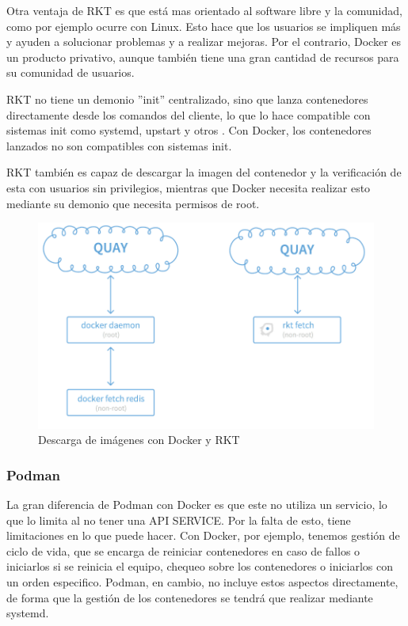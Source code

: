 \documentclass[11pt,a4paper]{article}
\begin{document}
Otra ventaja de RKT es que está mas orientado al software libre y la comunidad, como por ejemplo ocurre con Linux. Esto hace que los usuarios se impliquen más y ayuden a solucionar problemas y a realizar mejoras. Por el contrario, Docker es un producto privativo, aunque también tiene una gran cantidad de recursos para su comunidad de usuarios.

RKT no tiene un demonio ''init'' centralizado, sino que lanza contenedores directamente desde los comandos del cliente, lo que lo hace compatible con sistemas init como systemd, upstart y otros \cite{rktvsdocker}. Con Docker, los contenedores lanzados no son compatibles con sistemas init.

RKT también es capaz de descargar la imagen del contenedor y la verificación de esta con usuarios sin privilegios, mientras que Docker necesita realizar esto mediante su demonio que necesita permisos de root.

\begin{figure}[H]
	\centering
	\includegraphics[scale=0.5]{images/crearImagen.png}
	\caption[Descarga de imágenes con Docker y RKT]{Descarga de imágenes con Docker y RKT}
	\label{fig:docker}
\end{figure}

\subsubsection{Podman}\label{ti:podman}
La gran diferencia de Podman con Docker es que este no utiliza un servicio, lo que lo limita al no tener una API SERVICE. Por la falta de esto, tiene limitaciones en lo que puede hacer.
Con Docker, por ejemplo, tenemos gestión de ciclo de vida, que se encarga de reiniciar contenedores en caso de fallos o iniciarlos si se reinicia el equipo, chequeo sobre los contenedores o iniciarlos con un orden especifico. Podman, en cambio, no incluye estos aspectos directamente, de forma que la gestión de los contenedores se tendrá que realizar mediante systemd. 
\end{document}

